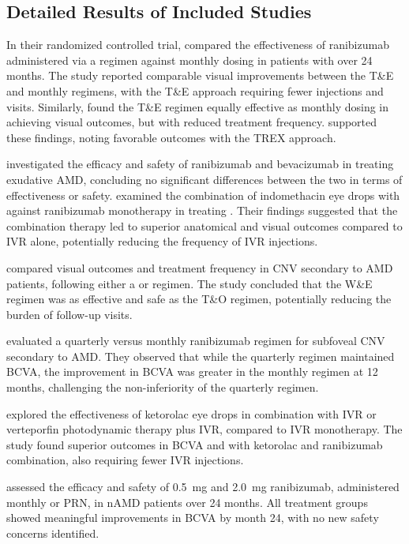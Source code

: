 \vfill

\subsection{Detailed Results of Included Studies}\label{s:detailed-results}
In their randomized controlled trial, \citet{kertes2020} compared the effectiveness of ranibizumab administered via a \TreatAndExtend regimen against monthly dosing in patients with \nAMD over 24 months. The study reported comparable visual improvements between the T\&E and monthly regimens, with the T\&E approach requiring fewer injections and visits. Similarly, \citet{kertes2019} found the T\&E regimen equally effective as monthly dosing in achieving visual outcomes, but with reduced treatment frequency. \citet{wykoff2018} supported these findings, noting favorable outcomes with the TREX approach.

\citet{nunes2019} investigated the efficacy and safety of ranibizumab and bevacizumab in treating exudative AMD, concluding no significant differences between the two in terms of effectiveness or safety. \citet{russo2018} examined the combination of indomethacin eye drops with \IVR against ranibizumab monotherapy in treating \CNV. Their findings suggested that the combination therapy led to superior anatomical and visual outcomes compared to IVR alone, potentially reducing the frequency of IVR injections.

\citet{eldem2015} compared visual outcomes and treatment frequency in CNV secondary to AMD patients, following either a \WaitAndExtend or \TreatAndObserve regimen. The study concluded that the W\&E regimen was as effective and safe as the T\&O regimen, potentially reducing the burden of follow-up visits.

\citet{schmidt2011} evaluated a quarterly versus monthly ranibizumab regimen for subfoveal CNV secondary to AMD. They observed that while the quarterly regimen maintained BCVA, the improvement in BCVA was greater in the monthly regimen at 12 months, challenging the non-inferiority of the quarterly regimen.

\citet{semeraro2015} explored the effectiveness of ketorolac eye drops in combination with IVR or verteporfin photodynamic therapy plus IVR, compared to IVR monotherapy. The study found superior outcomes in BCVA and \newterm{\CRT} with ketorolac and ranibizumab combination, also requiring fewer IVR injections.

\citet{ho2014} assessed the efficacy and safety of \qty{0.5}{\milli\gram} and \qty{2.0}{\milli\gram} ranibizumab, administered monthly or PRN, in nAMD patients over 24 months. All treatment groups showed meaningful improvements in BCVA by month 24, with no new safety concerns identified.

